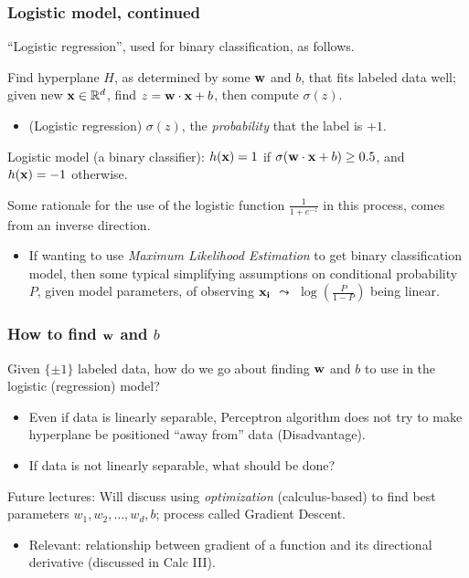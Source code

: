 \documentclass{beamer}
\theoremstyle{example}
\begin{document}
\begin{frame}
\frametitle{Logistic model, continued}
    ``Logistic regression'', used for binary classification, as follows.
    
    Find hyperplane $H$, as determined by some ${\bf w}$ and $b$, that fits labeled data well; given new ${\bf x}\in\mathbb R^d$, find $z = {\bf w}\cdot{\bf x}+b$, then compute $\sigma(z)$. 
    \begin{itemize}
        \item (Logistic regression) $\sigma(z)$, the \textit{probability} that the label is $+1$.
    \end{itemize}
    
    Logistic model (a binary classifier): $h({\bf x})=1$ if $\sigma({\bf w}\cdot{\bf x}+b) \ge 0.5$, and $h({\bf x})=-1$ otherwise. 
    
    \pause 
    Some rationale for the use of the logistic function $\frac{1}{1+e^{-z}}$ in this process, comes from an inverse direction. 
    \begin{itemize}
        \item If wanting to use \textit{Maximum Likelihood Estimation} to get binary classification model, then some typical simplifying assumptions on conditional probability $P$, given model parameters, of observing ${\bf x_i}$ \qquad $\leadsto$ $\log\left(\frac{P}{1-P}\right)$ being linear.
    \end{itemize}

\end{frame}
\begin{frame}
    \frametitle{How to find ${\bf w}$ and $b$}
    Given $\{\pm1\}$ labeled data, how do we go about finding ${\bf w}$ and $b$ to use in the logistic (regression) model?

    \pause
    \begin{itemize}
        \item Even if data is linearly separable, Perceptron algorithm does not try to make hyperplane be positioned ``away from'' data (Disadvantage). 
        \item If data is not linearly separable, what should be done?
    \end{itemize}

    \pause
    Future lectures: Will discuss using \emph{optimization} (calculus-based) to find best parameters $w_1,w_2,\ldots,w_d,b$; process called Gradient Descent. 
    \pause
    \begin{itemize}
        \item Relevant: relationship between {gradient} of a function and its {directional derivative} (discussed in Calc III).
    \end{itemize}
\end{frame}
\end{document}
